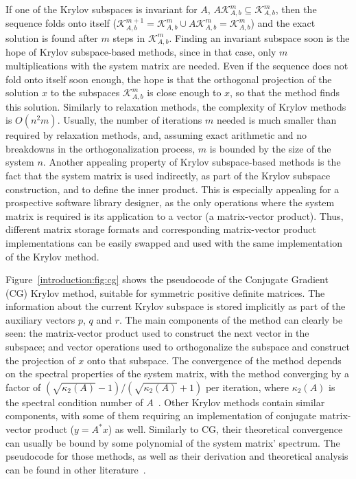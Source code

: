 If one of the Krylov subspaces is invariant for $A$, \ie $A \mathcal{K}_{A,
b}^m \subseteq \mathcal{K}_{A, b}^m$, then the sequence folds onto itself
($\mathcal{K}_{A, b}^{m + 1} = \mathcal{K}_{A, b}^m \cup A \mathcal{K}_{A, b}^m
= \mathcal{K}_{A, b}^m$) and the exact solution is found after $m$ steps in
$\mathcal{K}_{A, b}^m$. Finding an invariant subspace soon is the hope of Krylov
subspace-based methods, since in that case, only $m$ multiplications with the
system matrix are needed. Even if the sequence does not fold onto itself soon
enough, the hope is that the orthogonal projection of the solution $x$ to the
subspaces $\mathcal{K}_{A, b}^m$ is close enough to $x$, so that the method
finds this solution. Similarly to relaxation methods, the complexity of Krylov
methods is $O(n^2 m)$. Usually, the number of iterations $m$ needed is much
smaller than required by relaxation methods, and, assuming exact arithmetic and
no breakdowns in the orthogonalization process, $m$ is bounded by the size of
the system $n$.  Another appealing property of Krylov subspace-based methods is
the fact that the system matrix is used indirectly, as part of the Krylov
subspace construction, and to define the inner product. This is especially
appealing for a prospective software library designer, as the only operations
where the system matrix is required is its application to a vector (\ie a
matrix-vector product).  Thus, different matrix storage formats and
corresponding matrix-vector product implementations can be easily swapped and
used with the same implementation of the Krylov method.

Figure~\ref{introduction:fig:cg} shows the pseudocode of the Conjugate Gradient
(CG) Krylov method, suitable for symmetric positive definite matrices. The
information about the current Krylov subspace is stored implicitly as part of
the auxiliary vectors $p$, $q$ and $r$. The main components of the method can
clearly be seen: the matrix-vector product used to construct the next vector in
the subspace; and vector operations used to orthogonalize the subspace and
construct the projection of $x$ onto that subspace. The convergence of the
method depends on the spectral properties of the system matrix, with the method
converging by a factor of $(\sqrt{\kappa_2(A)} - 1)/(\sqrt{\kappa_2(A)} + 1)$
per iteration, where $\kappa_2(A)$ is the spectral condition number of
$A$~\cite{barrettemplates,demmel,saad}. Other Krylov methods contain similar
components, with some of them requiring an implementation of conjugate
matrix-vector product ($y = A^*x$) as well. Similarly to CG, their theoretical
convergence can usually be bound by some polynomial of the system matrix'
spectrum. The pseudocode for those methods, as well as their derivation and
theoretical analysis can be found in other
literature~\cite{barrettemplates,demmel,saad}.

